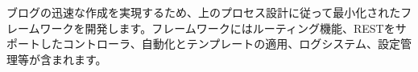 ブログの迅速な作成を実現するため、上のプロセス設計に従って最小化されたフレームワークを開発します。フレームワークにはルーティング機能、RESTをサポートしたコントローラ、自動化とテンプレートの適用、ログシステム、設定管理等が含まれます。

